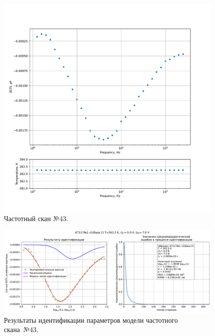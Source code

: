 \begin{figure}[!ht]
    \centering
    \includegraphics[width=1\textwidth]{../plots/КТ117№1_п1(база 2)_2500Гц-1Гц_1пФ_-10С_-5В-7В_50мВ_20мкс_шаг_0,1.pdf}
    \caption{Частотный скан №43.}
    \label{pic:frequency_scan_43}
\end{figure}

\begin{figure}[!ht]
    \centering
    \includegraphics[width=1\textwidth]{../plots/КТ117№1_п1(база 2)_2500Гц-1Гц_1пФ_-10С_-5В-7В_50мВ_20мкс_шаг_0,1_model.pdf}
    \caption{Результаты идентификации параметров модели частотного скана~№43.}
    \label{pic:frequency_scan_model43}
\end{figure}

\pagebreak


